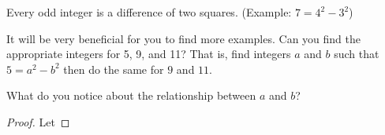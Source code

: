 \begin{claim} Every odd integer is a difference of two squares.  (Example: $7=4^2-3^2$)
\end{claim}
\begin{mdframed}
	\begin{question}[resume]
	\item It will be very beneficial for you to find more examples.  Can you find the appropriate integers for 5, 9, and 11?  That is, find integers $a$ and $b$ such that $5 = a^2-b^2$ then do the same for $9$ and $11$.
	\vspace{2in}
	\item What do you notice about the relationship between $a$ and $b$?
	\vspace{1in}
	\end{question}



\begin{proof} Let

\vspace{3.65in}
\end{proof}
\end{mdframed}





